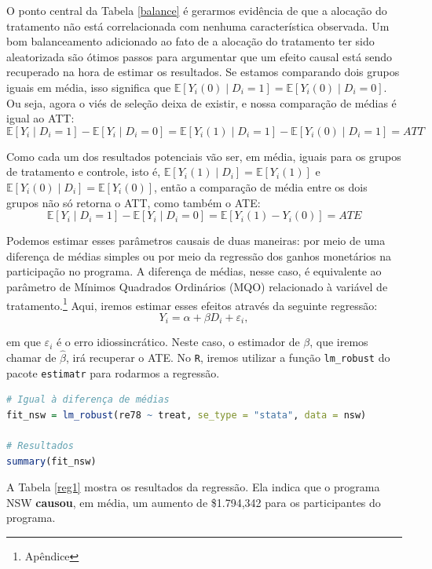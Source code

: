 O ponto central da Tabela \ref{balance} é gerarmos evidência de que a alocação do tratamento não está correlacionada com nenhuma característica observada. Um bom balanceamento adicionado ao fato de a alocação do tratamento ter sido aleatorizada são ótimos passos para argumentar que um efeito causal está sendo recuperado na hora de estimar os resultados. Se estamos comparando dois grupos iguais em média, isso significa que $\mathbb{E}[Y_i(0) \mid D_i = 1] = \mathbb{E}[Y_i(0) \mid D_i = 0]$. Ou seja, agora o viés de seleção deixa de existir, e nossa comparação de médias é igual ao ATT:
$$
\mathbb{E}[Y_i \mid D_i = 1] - \mathbb{E}[Y_i \mid D_i = 0] = \mathbb{E}[Y_i(1) \mid D_i = 1]  -\mathbb{E}[Y_i(0) \mid D_i = 1] = ATT
$$

Como cada um dos resultados potenciais vão ser, em média, iguais para os grupos de tratamento e controle, isto é, $\mathbb{E}[Y_i(1) \mid D_i] = \mathbb{E}[Y_i(1)]$ e $\mathbb{E}[Y_i(0) \mid D_i] = \mathbb{E}[Y_i(0)]$, então a comparação de média entre os dois grupos não só retorna o ATT, como também o ATE:
$$
\mathbb{E}[Y_i \mid D_i = 1] - \mathbb{E}[Y_i \mid D_i = 0] = \mathbb{E}[Y_i(1) - Y_i(0)]  = ATE
$$

Podemos estimar esses parâmetros causais de duas maneiras: por meio de uma diferença de médias simples ou por meio da regressão dos ganhos monetários na participação no programa. A diferença de médias, nesse caso, é equivalente ao parâmetro de Mínimos Quadrados Ordinários (MQO) relacionado à variável de tratamento.\footnote{Apêndice} Aqui, iremos estimar esses efeitos através da seguinte regressão:
$$
Y_i = \alpha + \beta D_i + \varepsilon_i,
$$

\noindent em que $\varepsilon_i$ é o erro idiossincrático. Neste caso, o estimador de $\beta$, que iremos chamar de $\hat{\beta}$, irá recuperar o ATE. No \texttt{R}, iremos utilizar a função \texttt{lm\_robust} do pacote \texttt{estimatr} para rodarmos a regressão.

\begin{boxH}
\begin{lstlisting}[language = R]
# Igual à diferença de médias
fit_nsw = lm_robust(re78 ~ treat, se_type = "stata", data = nsw)

# Resultados
summary(fit_nsw)
\end{lstlisting}
\end{boxH}

A Tabela \ref{reg1} mostra os resultados da regressão. Ela indica que o programa NSW \textbf{causou}, em média, um aumento de \$1.794,342 para os participantes do programa.


